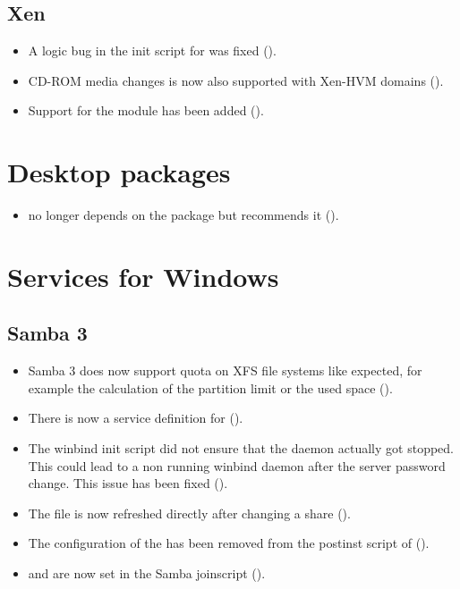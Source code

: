 \subsection{Xen}
\begin{itemize}
\item A logic bug in the init script for  was fixed ().
\item CD-ROM media changes is now also supported with Xen-HVM domains ().
\item Support for the  module has been added ().
\end{itemize}



\section{Desktop packages}
\begin{itemize}
\item {} no longer depends on the package
 but recommends it ().
\end{itemize}


\section{Services for Windows}

\subsection{Samba 3}
\begin{itemize}
\item Samba 3 does now support quota on XFS file systems like expected, for example the calculation of the partition limit or the used space ().
\item There is now a service definition for  ().
\item The winbind init script did not ensure that the daemon actually got stopped. This could lead
 to a non running winbind daemon after the server password change. This issue has been fixed
 ().
\item The file  is now refreshed directly after changing a share ().
\item The configuration of the  has been removed from
the postinst script of  ().
\item {} and  are now set in the Samba joinscript ().
\end{itemize}

